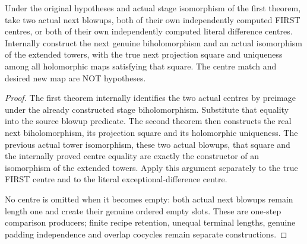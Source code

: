 \begin{theorem}
\label{hir:sharp-original-curve-computed-defect-next-stage-comparison}
\leanok
Under the original hypotheses and actual stage isomorphism of the first
theorem, take two actual next blowups, both of their own independently
computed FIRST centres, or both of their own independently computed
literal difference centres. Internally construct the next genuine
biholomorphism and an actual isomorphism of the extended towers, with
the true next projection square and uniqueness among all holomorphic
maps satisfying that square. The centre match and desired new map are
NOT hypotheses.
\end{theorem}
\begin{proof}
The first theorem internally identifies the two actual centres by
preimage under the already constructed stage biholomorphism. Substitute
that equality into the source blowup predicate. The second theorem then
constructs the real next biholomorphism, its projection square and its
holomorphic uniqueness. The previous actual tower isomorphism, these two
actual blowups, that square and the internally proved centre equality
are exactly the constructor of an isomorphism of the extended towers.
Apply this argument separately to the true FIRST centre and to the
literal exceptional-difference centre.

No centre is omitted when it becomes empty: both actual next blowups
remain length one and create their genuine ordered empty slots. These
are one-step comparison producers; finite recipe retention, unequal
terminal lengths, genuine padding independence and overlap cocycles
remain separate constructions.
\end{proof}
